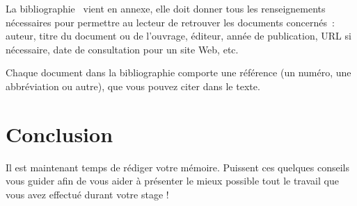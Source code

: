 \documentclass [twoside,openright,a4paper,11pt,french] {report}
\begin{document}
La bibliographie~\cite {savoirs2010} vient en annexe, elle doit donner
tous les renseignements nécessaires pour permettre au lecteur de
retrouver les documents concernés~: auteur, titre du document ou de
l'ouvrage, éditeur, année de publication, URL si nécessaire, date de
consultation pour un site Web, etc.

Chaque document dans la bibliographie comporte une référence
(un numéro, une abbréviation ou autre), que vous pouvez citer dans le
texte.


\chapter {Conclusion}
    \label {chap:conc}

Il est maintenant temps de rédiger votre mémoire. Puissent ces quelques
conseils vous guider afin de vous aider à présenter le mieux possible
tout le travail que vous avez effectué durant votre stage !



\cleardoublepage


\end{document}
